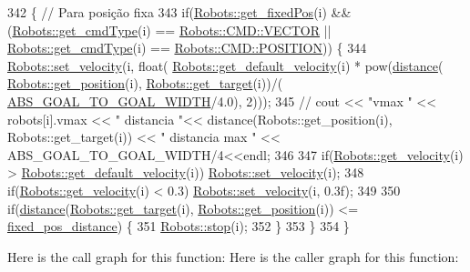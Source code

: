 \begin{DoxyCode}
342                                          \{ \textcolor{comment}{// Para posição fixa}
343     \textcolor{keywordflow}{if}(\hyperlink{class_robots_af1b330514c96d1cac03a895007b8b54e}{Robots::get\_fixedPos}(i) && (\hyperlink{class_robots_abc1028ef8481db1426eb5a093c554ac9}{Robots::get\_cmdType}(i) == 
      \hyperlink{serial_w_8hpp_ac6e89954deaa373db52a91ac6db50884}{Robots::CMD::VECTOR} || \hyperlink{class_robots_abc1028ef8481db1426eb5a093c554ac9}{Robots::get\_cmdType}(i) == 
      \hyperlink{serial_w_8hpp_a440f0e10bb28b153f5661c934bc6b89f}{Robots::CMD::POSITION})) \{
344         \hyperlink{class_robots_ae37da9b7ca9d84bee564c328db139758}{Robots::set\_velocity}(i, \textcolor{keywordtype}{float}(
      \hyperlink{class_robots_a3b226dd339a3b7a41c120f7d6a1bc515}{Robots::get\_default\_velocity}(i) * pow(\hyperlink{class_strategy_aacce05caed71553c4efd2d28c9c3aa39}{distance}(
      \hyperlink{class_robots_a1fca8f2f5070176faa6ba1efa2f1ff14}{Robots::get\_position}(i), \hyperlink{class_robots_a8a4fe339df4823e45cf34d9fb8daa64b}{Robots::get\_target}(i))/(
      \hyperlink{namespace_c_o_n_s_t_abe3ca2e589a94f9e273309abaa8313d4}{ABS\_GOAL\_TO\_GOAL\_WIDTH}/4.0), 2)));
345         \textcolor{comment}{// cout << "vmax " << robots[i].vmax << " distancia "<< distance(Robots::get\_position(i),
       Robots::get\_target(i)) << " distancia max " << ABS\_GOAL\_TO\_GOAL\_WIDTH/4<<endl;}
346 
347         \textcolor{keywordflow}{if}(\hyperlink{class_robots_ac2b2d9709dd5d86723d9dc00dddaabaf}{Robots::get\_velocity}(i) > 
      \hyperlink{class_robots_a3b226dd339a3b7a41c120f7d6a1bc515}{Robots::get\_default\_velocity}(i)) 
      \hyperlink{class_robots_ae37da9b7ca9d84bee564c328db139758}{Robots::set\_velocity}(i);
348         \textcolor{keywordflow}{if}(\hyperlink{class_robots_ac2b2d9709dd5d86723d9dc00dddaabaf}{Robots::get\_velocity}(i) < 0.3) 
      \hyperlink{class_robots_ae37da9b7ca9d84bee564c328db139758}{Robots::set\_velocity}(i, 0.3f);
349 
350         \textcolor{keywordflow}{if}(\hyperlink{class_strategy_aacce05caed71553c4efd2d28c9c3aa39}{distance}(\hyperlink{class_robots_a8a4fe339df4823e45cf34d9fb8daa64b}{Robots::get\_target}(i), 
      \hyperlink{class_robots_a1fca8f2f5070176faa6ba1efa2f1ff14}{Robots::get\_position}(i)) <= \hyperlink{namespace_c_o_n_s_t_ae8d764cbcf03a0351752bff7d9cb30e6}{fixed\_pos\_distance}) \{
351             \hyperlink{class_robots_ac3452d86940fa017a16f7be4fe099d89}{Robots::stop}(i);
352         \}
353     \}
354 \}
\end{DoxyCode}
Here is the call graph for this function\+:
Here is the caller graph for this function\+:
\mbox{\label{class_strategy_a08e53a7b4e9239e2536dcdbf2cc6abf5}} 
